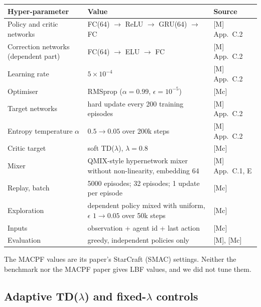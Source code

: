\begin{table}[H]
\centering\small
\begin{tabularx}{\textwidth}{l X l}
\toprule
Hyper-parameter & Value & Source \\
\midrule
Policy and critic networks & FC(64) $\to$ ReLU $\to$ GRU(64) $\to$ FC & [M] App.~C.2 \\
Correction networks (dependent part) & FC(64) $\to$ ELU $\to$ FC & [M] App.~C.2 \\
Learning rate & $5\times10^{-4}$ & [M] App.~C.2 \\
Optimiser & RMSprop ($\alpha=0.99$, $\epsilon=10^{-5}$) & [Mc] \\
Target networks & hard update every 200 training episodes & [M] App.~C.2 \\
Entropy temperature $\alpha$ & $0.5\to0.05$ over 200k steps & [M] App.~C.2 \\
Critic target & soft TD($\lambda$), $\lambda=0.8$ & [Mc] \\
Mixer & QMIX-style hypernetwork mixer without non-linearity, embedding 64 & [M] App.~C.1, E \\
Replay, batch & 5000 episodes; 32 episodes; 1 update per episode & [Mc] \\
Exploration & dependent policy mixed with uniform, $\epsilon$ $1\to0.05$ over 50k steps & [Mc] \\
Inputs & observation + agent id + last action & [Mc] \\
Evaluation & greedy, independent policies only & [M], [Mc] \\
\bottomrule
\end{tabularx}
\end{table}

The MACPF values are its paper's StarCraft (SMAC) settings. Neither the benchmark nor the MACPF
paper gives LBF values, and we did not tune them.

\subsection{Adaptive TD($\lambda$) and fixed-$\lambda$ controls}

